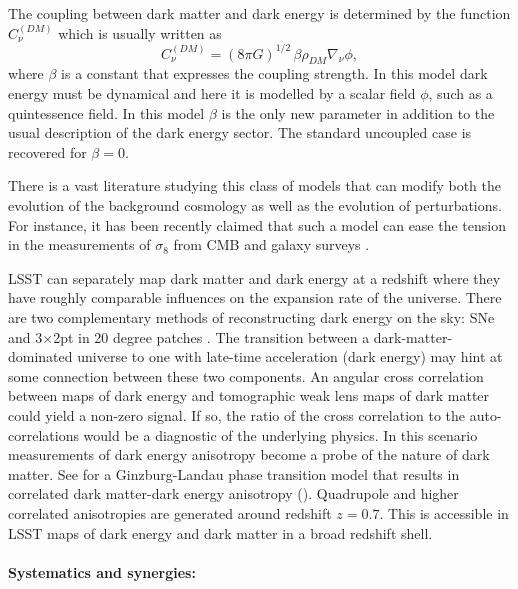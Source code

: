 The coupling between dark matter and dark energy is determined by the function $C^{(DM)}_{\nu}$ which is usually
written as
\begin{equation}
C^{(DM)}_{\nu} = (8\pi G)^{1/2} \,\beta\rho_{DM}\nabla_{\nu} \phi,
\end{equation}
where $\beta$ is a constant that expresses the coupling strength. In this model dark energy must be dynamical and here it is modelled by a scalar field  $\phi$, such as a quintessence field.
In this model $\beta$ is the only new parameter in addition to the usual description of the dark energy sector.
The standard uncoupled case is recovered for $\beta=0$.

There is a vast literature studying this class of models that can modify both the evolution of the 
background cosmology as well as the evolution of perturbations. For instance, it has been recently claimed
that such a model can ease the tension in the measurements of $\sigma_8$ from CMB and galaxy surveys 
\citep{Barros:2018efl}.

LSST can separately map dark matter and dark energy at a redshift where they have roughly comparable influences on the expansion rate of the universe. 
There are two complementary methods of reconstructing dark energy on the sky: SNe and 3$\times$2pt in 20 degree patches \citep[Figure 15.9 in ][]{0912.0201}.
The transition between a dark-matter-dominated universe to one with late-time acceleration (dark energy) may hint at some connection between these two components. 
An angular cross correlation between maps of dark energy and tomographic weak lens maps of dark matter could yield a non-zero signal.  
If so, the ratio of the cross correlation to the auto-correlations would be a diagnostic of the underlying physics. 
In this scenario measurements of dark energy anisotropy become a probe of the nature of dark matter. 
See \cite{1810.11007} for a Ginzburg-Landau phase transition model that results in correlated dark matter-dark energy anisotropy (). 
Quadrupole and higher correlated anisotropies are generated around redshift $z=0.7$.  
This is accessible in LSST maps of dark energy and dark matter in a broad redshift shell.

\paragraph{Systematics and synergies:}

